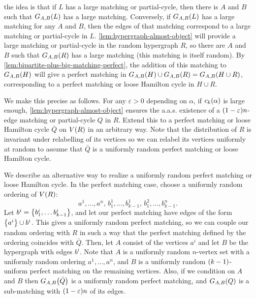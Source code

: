 \documentclass[11pt,english]{article}
\theoremstyle{plain}
\theoremstyle{definition}
\theoremstyle{definition}
\theoremstyle{plain}
\theoremstyle{plain}
\theoremstyle{plain}
\theoremstyle{plain}
\theoremstyle{remark}
\theoremstyle{remark}
\let\originalleft\left
\let\originalright\right
\renewcommand{\left}{\mathopen{}\mathclose\bgroup\originalleft}
\renewcommand{\right}{\aftergroup\egroup\originalright}
\begin{document}
the idea is that if $L$ has a large matching or partial-cycle, then there
is $A$ and $B$ such that $G_{A,B}\left(L\right)$ has a large matching. Conversely,
if $G_{A,B}\left(L\right)$ has a large matching for any $A$
and $B$, then the edges of that matching correspond to a large matching or partial-cycle in $L$. \ref{lem:hypergraph-almost-object}
will provide a large matching or partial-cycle in the random hypergraph $R$, so there are $A$
and $B$ such that $G_{A,B}\left(R\right)$ has a large matching (this matching is itself random).
By \ref{lem:bipartite-plus-big-matching-perfect}, the addition of
this matching to $G_{A,B}\left(H\right)$ will give a perfect
matching in $G_{A,B}\left(H\right)\cup G_{A,B}\left(R\right)=G_{A,B}\left(H\cup R\right)$,
corresponding to a perfect matching or loose Hamilton cycle in $H\cup R$.

We make this precise as follows. For any $\varepsilon>0$ depending on $\alpha$, if $\chyp\left(\alpha\right)$
is large enough, \ref{lem:hypergraph-almost-object} ensures the a.a.s.{}
existence of a $\left(1-\varepsilon\right)n$-edge matching or partial-cycle $Q$ in $R$. Extend this to a perfect matching or loose Hamilton cycle
$\bar{Q}$ on $V\left(R\right)$ in an arbitrary way. Note that the distribution of $R$
is invariant under relabelling of its vertices so we can relabel its
vertices uniformly at random to assume that $\bar{Q}$ is a uniformly
random perfect matching or loose Hamilton cycle.

We describe an alternative way to realize a uniformly random perfect
matching or loose Hamilton cycle. In the perfect matching case, choose a
uniformly random ordering of $V\left(R\right)$: 
\[
a^{1},\dots,a^{n},\, b_{1}^{1},\dots,b_{k-1}^{1},\, b_{1}^{2},\dots,b_{k-1}^{n}.
\]
Let $b^{i}=\left\{ b_{1}^{i},\dots b_{k-1}^{i}\right\}$, and let our perfect matching have edges of the form $\left\{a^{i}\right\}\cup b^i $.
This gives a uniformly random perfect matching, so we can couple our
random ordering with $R$ in such a way that the perfect matching
defined by the ordering coincides with $\bar{Q}$. Then, let $A$
consist of the vertices $a^{i}$ and let $B$ be the hypergraph with
edges $b^i$.
Note that $A$ is a uniformly random $n$-vertex set with a uniformly random ordering $a^{1},\dots,a^{n}$, and $B$ is a
uniformly random $\left(k-1\right)$-uniform perfect matching on the remaining vertices. Also,
if we condition on $A$ and $B$ then $G_{A,B}\left(\bar{Q}\right)$
is a uniformly random perfect matching, and $G_{A,B}\left(Q\right)$
is a sub-matching with $\left(1-\varepsilon\right)n$ of its edges.
\end{document}
